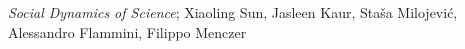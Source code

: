 \begin{thebibliography}{99}
\bibitem{} \emph{Social Dynamics of Science}; Xiaoling Sun, Jasleen Kaur, Sta\v{s}a Milojevi\'{c}, Alessandro Flammini, Filippo Menczer
\end{thebibliography}